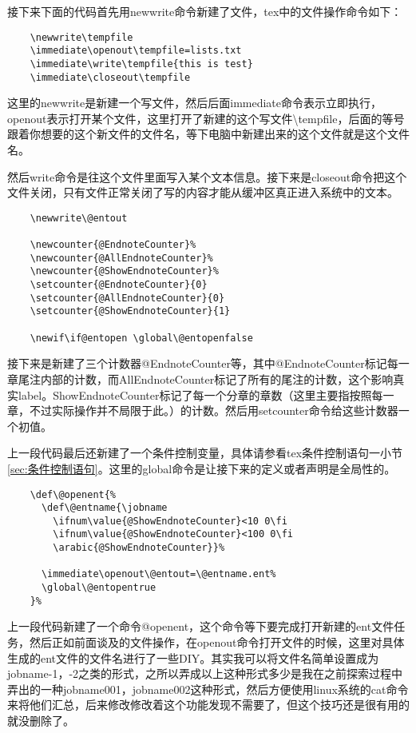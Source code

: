 \documentclass[11pt,oneside]{book}
\begin{document}
  接下来下面的代码首先用newwrite命令新建了文件，tex中的文件操作命令如下：
  \begin{Verbatim}
    \newwrite\tempfile
    \immediate\openout\tempfile=lists.txt
    \immediate\write\tempfile{this is test}
    \immediate\closeout\tempfile
  \end{Verbatim}
  这里的newwrite是新建一个写文件，然后后面immediate命令表示立即执行，openout表示打开某个文件，这里打开了新建的这个写文件\textbackslash tempfile，后面的等号跟着你想要的这个新文件的文件名，等下电脑中新建出来的这个文件就是这个文件名。

  然后write命令是往这个文件里面写入某个文本信息。接下来是closeout命令把这个文件关闭，只有文件正常关闭了写的内容才能从缓冲区真正进入系统中的文本。


  \begin{Verbatim}
    \newwrite\@entout

    \newcounter{@EndnoteCounter}%
    \newcounter{@AllEndnoteCounter}%
    \newcounter{@ShowEndnoteCounter}%
    \setcounter{@EndnoteCounter}{0}
    \setcounter{@AllEndnoteCounter}{0}
    \setcounter{@ShowEndnoteCounter}{1}

    \newif\if@entopen \global\@entopenfalse
  \end{Verbatim}
  接下来是新建了三个计数器@EndnoteCounter等，其中@EndnoteCounter标记每一章尾注内部的计数，而AllEndnoteCounter标记了所有的尾注的计数，这个影响真实label。ShowEndnoteCounter标记了每一个分章的章数（这里主要指按照每一章，不过实际操作并不局限于此。）的计数。然后用setcounter命令给这些计数器一个初值。

  上一段代码最后还新建了一个条件控制变量，具体请参看tex条件控制语句一小节\ref{sec:条件控制语句}。这里的global命令是让接下来的定义或者声明是全局性的。

  \begin{Verbatim}
    \def\@openent{%
      \def\@entname{\jobname
        \ifnum\value{@ShowEndnoteCounter}<10 0\fi
        \ifnum\value{@ShowEndnoteCounter}<100 0\fi
        \arabic{@ShowEndnoteCounter}}%

      \immediate\openout\@entout=\@entname.ent%
      \global\@entopentrue
    }%
  \end{Verbatim}
  上一段代码新建了一个命令@openent，这个命令等下要完成打开新建的ent文件任务，然后正如前面谈及的文件操作，在openout命令打开文件的时候，这里对具体生成的ent文件的文件名进行了一些DIY。其实我可以将文件名简单设置成为jobname-1，-2之类的形式，之所以弄成以上这种形式多少是我在之前探索过程中弄出的一种jobname001，jobname002这种形式，然后方便使用linux系统的cat命令来将他们汇总，后来修改修改着这个功能发现不需要了，但这个技巧还是很有用的就没删除了。
\end{document}
